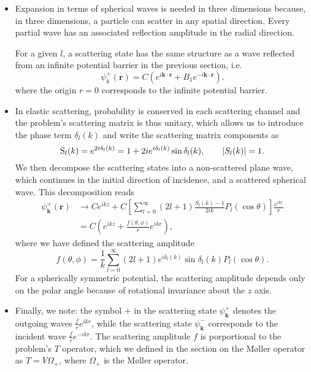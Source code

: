 \documentclass[11pt, a4paper]{article}
\newcommand{\Mol}{M\o ller\xspace}
\renewcommand{\vec}[1]{\bm{#1}}  %
\renewcommand{\r}{\vec{r}}  %
\begin{document}
\begin{itemize}
    \item Expansion in terms of spherical waves is needed in three dimensions because, in three dimensions, a particle can scatter in any spatial direction. Every partial wave has an associated reflection amplitude in the radial direction. 

    For a given $ l $, a scattering state has the same structure as a wave reflected from an infinite potential barrier in the previous section, i.e. 
    \begin{equation*}
        \psi_{k}^{+}(\r) = C \left( e^{i \vec{k} \cdot \r} + B_{1} e^{- i \vec{k} \cdot \r} \right).
    \end{equation*}
    where the origin $ r = 0 $ corresponds to the infinite potential barrier. 
    
    \item In elastic scattering, probability is conserved in each scattering channel and the problem's scattering matrix is thus unitary, which allows us to introduce the phase term $ \delta_{l}(k) $ and write the scattering matrix components as
    \begin{equation*}
        \mathrm{S}_{l}(k) = e^{2i \delta_{l}(k)} = 1 + 2i e^{i \delta_{l}(k)} \sin \delta_{l}(k), \qquad \abs{S_{l}(k)} = 1.
    \end{equation*}
    We then decompose the scattering states into a non-scattered plane wave, which continues in the initial direction of incidence, and a scattered spherical wave. This decomposition reads
    \begin{align*}
        \psi_{\vec{k}}^{+}(\r) &\to C e^{ikz} + C \left[ \sum_{l = 0}^{\infty} (2l + 1) \frac{S_{l}(k) - 1}{2ik} P_{l}(\cos \theta) \right]\frac{e^{ikr}}{r}\\
        & = C \left( e^{ikz} + \frac{f(\theta, \phi)}{r} e^{ikr} \right),
    \end{align*}
    where we have defined the scattering amplitude
    \begin{equation*}
        f(\theta, \phi) = \frac{1}{k} \sum_{l = 0}^{\infty} (2l + 1)e^{i\delta_{l}(k)} \sin \delta_{l}(k) P_{l}(\cos \theta).
    \end{equation*}
    For a spherically symmetric potential, the scattering amplitude depends only on the polar angle because of rotational invariance about the $ z $ axis. 

    \item Finally, we note: the symbol $ + $ in the scattering state $ \psi_{\vec{k}}^{+} $ denotes the outgoing waves $ \frac{f}{r}e^{ikr} $, while the scattering state $ \psi_{\vec{k}}^{-} $ corresponds to the incident wave $ \frac{f}{r}e^{-ikr} $. The scattering amplitude $ f $ is porportional to the problem's $ T $ operator, which we defined in the section on the \Mol operator as $ T = V \Omega_{+} $, where $ \Omega_{+} $ is the \Mol operator.

    
\end{itemize}
\end{document}
